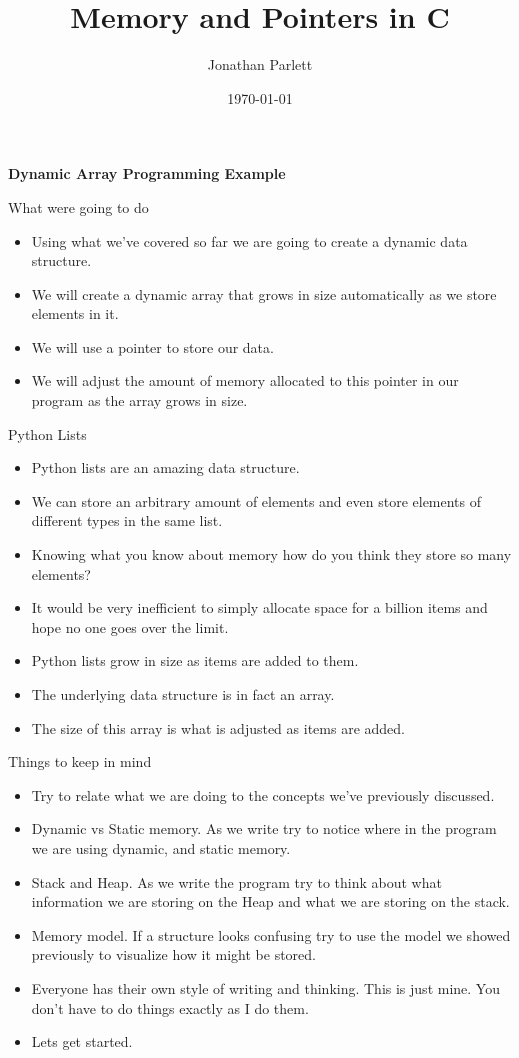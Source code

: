 \documentclass{beamer}
\title{Memory and Pointers in C}
\author{Jonathan Parlett}
\date{\today}
\begin{document}
\begin{frame}
    \titlepage
	{\bf Dynamic Array Programming Example}
\end{frame}

\begin{frame}{What were going to do}
	\begin{itemize}[<+->]
		\item Using what we've covered so far we are going to create a dynamic data structure.
		\item We will create a dynamic array that grows in size automatically as we store elements in it.
		\item We will use a pointer to store our data. 
		\item We will adjust the amount of memory allocated to this pointer in our program as the array grows in size.
	\end{itemize}
\end{frame}

\begin{frame}{Python Lists}
	\begin{itemize}[<+->]
		\item Python lists are an amazing data structure.
		\item We can store an arbitrary amount of elements and even store elements of different types in the same list.
		\item Knowing what you know about memory how do you think they store so many elements?
		\item It would be very inefficient to simply allocate space for a billion items and hope no one goes over the limit.
		\item Python lists grow in size as items are added to them.
		\item The underlying data structure is in fact an array.
		\item The size of this array is what is adjusted as items are added.
	\end{itemize}
\end{frame}
\begin{frame}{Things to keep in mind}
	\begin{itemize}[<+->]
		\item Try to relate what we are doing to the concepts we've previously discussed.
		\item Dynamic vs Static memory. As we write try to notice where in the program we are using dynamic, and static memory.
		\item Stack and Heap. As we write the program try to think about what information we are storing on the Heap and what we are storing on the stack.
		\item Memory model. If a structure looks confusing try to use the model we showed previously to visualize how it might be stored.
		\item Everyone has their own style of writing and thinking. This is just mine. You don't have to do things exactly as I do them.
		\item Lets get started.
	\end{itemize}
\end{frame}
\end{document}
